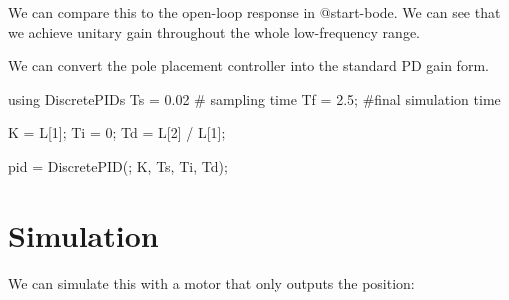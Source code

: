 \documentclass[
  8pt,
  a4paper,
]{book}
\newenvironment{Shaded}{\begin{snugshade}}{\end{snugshade}}
\newcommand{\BuiltInTok}[1]{\textcolor[rgb]{0.00,0.23,0.31}{#1}}
\newcommand{\CommentTok}[1]{\textcolor[rgb]{0.37,0.37,0.37}{#1}}
\newcommand{\FloatTok}[1]{\textcolor[rgb]{0.68,0.00,0.00}{#1}}
\newcommand{\FunctionTok}[1]{\textcolor[rgb]{0.28,0.35,0.67}{#1}}
\newcommand{\ImportTok}[1]{\textcolor[rgb]{0.00,0.46,0.62}{#1}}
\newcommand{\NormalTok}[1]{\textcolor[rgb]{0.00,0.23,0.31}{#1}}
\newcommand{\OperatorTok}[1]{\textcolor[rgb]{0.37,0.37,0.37}{#1}}
\begin{document}
We can compare this to the open-loop response in @start-bode. We can see
that we achieve unitary gain throughout the whole low-frequency range.

We can convert the pole placement controller into the standard PD gain
form.

\begin{Shaded}
\begin{Highlighting}[]
\ImportTok{using} \BuiltInTok{DiscretePIDs}
\NormalTok{Ts }\OperatorTok{=} \FloatTok{0.02} \CommentTok{\# sampling time}
\NormalTok{Tf }\OperatorTok{=} \FloatTok{2.5}\NormalTok{; }\CommentTok{\#final simulation time}

\NormalTok{K }\OperatorTok{=}\NormalTok{ L[}\FloatTok{1}\NormalTok{];}
\NormalTok{Ti }\OperatorTok{=} \FloatTok{0}\NormalTok{;}
\NormalTok{Td }\OperatorTok{=}\NormalTok{ L[}\FloatTok{2}\NormalTok{] }\OperatorTok{/}\NormalTok{ L[}\FloatTok{1}\NormalTok{];}

\NormalTok{pid }\OperatorTok{=} \FunctionTok{DiscretePID}\NormalTok{(; K, Ts, Ti, Td);}
\end{Highlighting}
\end{Shaded}

\section{Simulation}\label{simulation-2}

We can simulate this with a motor that only outputs the position:
\end{document}
